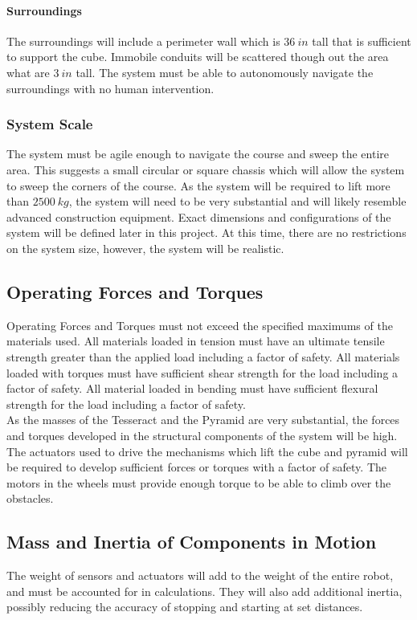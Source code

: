 \documentclass[12pt]{article}
\begin{document}
\paragraph{Surroundings} The surroundings will include a perimeter wall which is $36 \: in$ tall that is sufficient to support the cube. Immobile conduits will be scattered though out the area what are $3 \: in$ tall. The system must be able to autonomously navigate the surroundings with no human intervention.

\subsubsection{System Scale} 
The system must be agile enough to navigate the course and sweep the entire area. This suggests a small circular or square chassis which will allow the system to sweep the corners of the course. As the system will be required to lift more than $2500 \: kg$, the system will need to be very substantial and will likely resemble advanced construction equipment. Exact dimensions and configurations of the system will be defined later in this project. At this time, there are no restrictions on the system size, however, the system will be realistic.

\subsection{Operating Forces and Torques}
Operating Forces and Torques must not exceed the specified maximums of the materials used. All materials loaded in tension must have an ultimate tensile strength greater than the applied load including a factor of safety. All materials loaded with torques must have sufficient shear strength for the load including a factor of safety. All material loaded in bending must have sufficient flexural strength for the load including a factor of safety.\\

As the masses of the Tesseract and the Pyramid are very substantial, the forces and torques developed in the structural components of the system will be high. The actuators used to drive the mechanisms which lift the cube and pyramid will be required to develop sufficient forces or torques with a factor of safety. The motors in the wheels must provide enough torque to be able to climb over the obstacles. 

\subsection{Mass and Inertia of Components in Motion}
The weight of sensors and actuators will add to the weight of the entire robot, and must be accounted for in calculations. They will also add additional inertia, possibly reducing the accuracy of stopping and starting at set distances.
\end{document}
